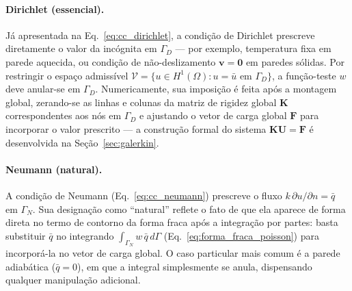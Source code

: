 \paragraph{Dirichlet (essencial).} Já apresentada na Eq.~\ref{eq:cc_dirichlet}, a condição de Dirichlet prescreve diretamente o valor da incógnita em $\Gamma_D$ --- por exemplo, temperatura fixa em parede aquecida, ou condição de não-deslizamento $\mathbf{v} = \mathbf{0}$ em paredes sólidas. Por restringir o espaço admissível $\mathcal{V} = \{u \in H^1(\Omega) : u = \bar{u} \text{ em } \Gamma_D\}$, a função-teste $w$ deve anular-se em $\Gamma_D$. Numericamente, sua imposição é feita após a montagem global, zerando-se as linhas e colunas da matriz de rigidez global $\mathbf{K}$ correspondentes aos nós em $\Gamma_D$ e ajustando o vetor de carga global $\mathbf{F}$ para incorporar o valor prescrito \cite{Zienkiewicz2013} --- a construção formal do sistema $\mathbf{K}\mathbf{U} = \mathbf{F}$ é desenvolvida na Seção~\ref{sec:galerkin}.

\paragraph{Neumann (natural).} A condição de Neumann (Eq.~\ref{eq:cc_neumann}) prescreve o fluxo $k\,\partial u / \partial n = \bar{q}$ em $\Gamma_N$. Sua designação como ``natural'' reflete o fato de que ela aparece de forma direta no termo de contorno da forma fraca após a integração por partes: basta substituir $\bar{q}$ no integrando $\int_{\Gamma_N} w\,\bar{q}\,d\Gamma$ (Eq.~\ref{eq:forma_fraca_poisson}) para incorporá-la no vetor de carga global. O caso particular mais comum é a parede adiabática ($\bar{q} = 0$), em que a integral simplesmente se anula, dispensando qualquer manipulação adicional.

